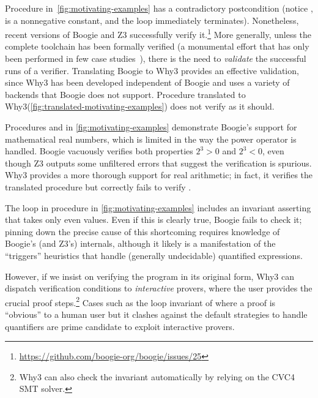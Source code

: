 \documentclass[a4paper,final]{llncs}
\newif\iflong
\newcommand{\Boogie}{Boogie\xspace}
\newcommand{\Why}{Why3\xspace}
\begin{document}
Procedure  in~\autoref{fig:motivating-examples} has a contradictory postcondition (notice ,  is a nonnegative constant, and the loop immediately terminates).
Nonetheless, recent versions of \Boogie and Z3 successfully verify it.\footnote{\url{https://github.com/boogie-org/boogie/issues/25}}
More generally, unless the complete toolchain has been formally verified (a monumental effort that has only been performed in few case studies~\cite{Leroy09,KleinAEHCDEEKNSTW10,KumarMNO14}), there is the need to \emph{validate} the successful runs of a verifier.
Translating \Boogie to \Why provides an effective validation, since \Why has been developed independent of \Boogie and uses a variety of backends that \Boogie does not support.
Procedure  translated to \Why (\autoref{fig:translated-motivating-examples}) does not verify as it should.

Procedures  and  in \autoref{fig:motivating-examples} demonstrate \Boogie's support for mathematical real numbers, which is limited in the way the power operator \B{**} is handled. \Boogie vacuously verifies both properties $2^3 > 0$ and $2^3 < 0$, even though Z3 outputs some unfiltered errors that suggest the verification is spurious{}\iflong{} (the power operator \B{**} is not properly supported); indeed, only the inequality encoded by \B{lemma_yes} is correct\fi.
\Why provides a more thorough support for real arithmetic\iflong, both by translating to backends such as Alt-Ergo and by providing a more effective encoding in Z3\fi; 
in fact, it verifies the translated procedure  but correctly fails to verify .

The loop in procedure  in \autoref{fig:motivating-examples} includes an invariant asserting that  takes only even values.
Even if this is clearly true, \Boogie fails to check it; 
pinning down the precise cause of this shortcoming requires knowledge of \Boogie's (and Z3's) internals, although it likely is a manifestation of the ``triggers'' heuristics that handle  (generally undecidable) quantified expressions. 
\iflong
Based on this knowledge, there are specification patterns that try to work around such idiosyncrasies; in the example, one could introduce a ``witness'' ghost variable \B{k} such that \B{i == 2*k} is an invariant.
\fi
However, if we insist on verifying the program in its original form, \Why can dispatch verification conditions to \emph{interactive} provers, where the user provides the crucial proof steps.\footnote{\Why can also check the invariant automatically by relying on the CVC4 SMT solver.}
Cases such as the loop invariant of  where a proof is ``obvious'' to a human user but it clashes against the default strategies to handle quantifiers are prime candidate to exploit interactive provers.
\iflong
Thus, translating \Boogie to \Why provides another means of exploiting the latter's versatile support for interactive provers and multiple backends.
\fi
\end{document}
